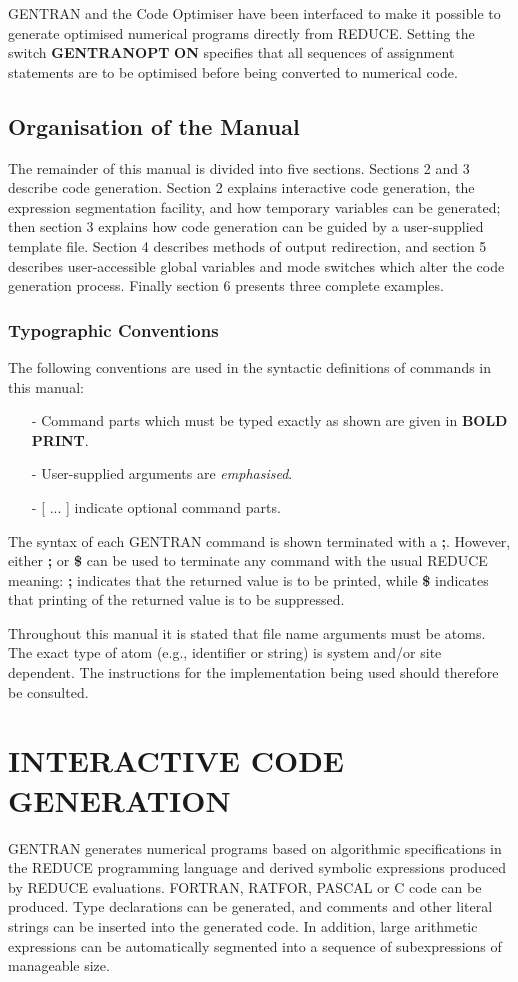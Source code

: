 GENTRAN and the Code Optimiser have been interfaced to
make it possible to generate optimised numerical programs directly
from REDUCE.  Setting the switch {\bf GENTRANOPT} {\bf ON}
specifies that all sequences of
assignment statements are to be optimised before being converted to
numerical code.

\section{Organisation of the Manual}
The remainder of this manual is divided into five sections.  Sections
2 and 3 describe code generation.  Section 2 explains interactive code
generation, the expression segmentation facility, and how temporary
variables can be generated; then section 3 explains how code generation
can be guided by a user-supplied template file.  Section 4 describes
methods of output redirection, and section 5 describes
user-accessible global variables and mode switches which alter the code
generation process.  Finally section 6 presents three complete examples.
\subsection{Typographic Conventions}
The following conventions are used in the syntactic definitions of
commands in this manual:
\begin{itemize}
\item[{-}]
Command parts which must be typed exactly as shown are given in 
{\bf BOLD PRINT}.
\item[{-}]
User-supplied arguments are {\it emphasised}.
\item[{-}]
[ ... ] indicate optional command parts.
\end{itemize}
The syntax of each GENTRAN command is shown terminated with a {\bf ;}.
However, either {\bf ;} or {\bf \$} can be used to terminate any
command with the usual REDUCE meaning:  {\bf ;} indicates that the
returned value is to be printed, while {\bf \$} indicates that printing
of the returned value is to be suppressed.

Throughout this manual it is stated that file name arguments must be
atoms.  The exact type of atom (e.g., identifier or string) is
system and/or site dependent.  The instructions for the implementation
being used should therefore be consulted.

\chapter{INTERACTIVE CODE GENERATION}
GENTRAN generates numerical programs based on algorithmic specifications
in the REDUCE programming language and derived symbolic expressions
produced by REDUCE evaluations.  FORTRAN, RATFOR, PASCAL or C code can be
produced.  Type declarations can be generated, and comments and
other literal strings can be inserted into the generated code.  In
addition, large arithmetic expressions can be automatically segmented
into a sequence of subexpressions of manageable size.

